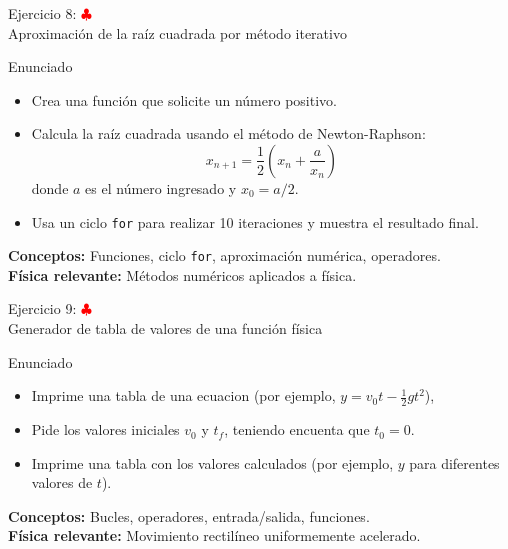 \documentclass[10pt]{beamer}
\begin{document}
\begin{frame}{Ejercicio 8: \hfill \textcolor{red}{$\clubsuit$} \\ Aproximación de la raíz cuadrada por método iterativo}
  \begin{block}{Enunciado}
    \begin{itemize}
      \item Crea una función que solicite un número positivo.
      \item Calcula la raíz cuadrada usando el método de Newton-Raphson:
        \[
        x_{n+1} = \frac{1}{2}\left(x_n + \frac{a}{x_n}\right)
        \]
        donde \(a\) es el número ingresado y \(x_0 = a/2\).
      \item Usa un ciclo \texttt{for} para realizar 10 iteraciones y muestra el resultado final.
    \end{itemize}
  \end{block}
  \textbf{Conceptos:} Funciones, ciclo \texttt{for}, aproximación numérica, operadores.\\
  \textbf{Física relevante:} Métodos numéricos aplicados a física.
\end{frame}



\begin{frame}{Ejercicio 9: \hfill \textcolor{red}{$\clubsuit$} \\ Generador de tabla de valores de una función física}
  \begin{block}{Enunciado}
    \begin{itemize}
      \item Imprime una tabla de una ecuacion (por ejemplo, \(y = v_0 t - \frac{1}{2}gt^2\)), 
      \item Pide los valores iniciales \(v_0\) y  \(t_f\), teniendo encuenta que \(t_0 = 0 \).
      \item Imprime una tabla con los valores calculados (por ejemplo, \(y\) para diferentes valores de \(t\)).
    \end{itemize}
  \end{block}
  \textbf{Conceptos:} Bucles, operadores, entrada/salida, funciones.\\
  \textbf{Física relevante:} Movimiento rectilíneo uniformemente acelerado.
\end{frame}
\end{document}
